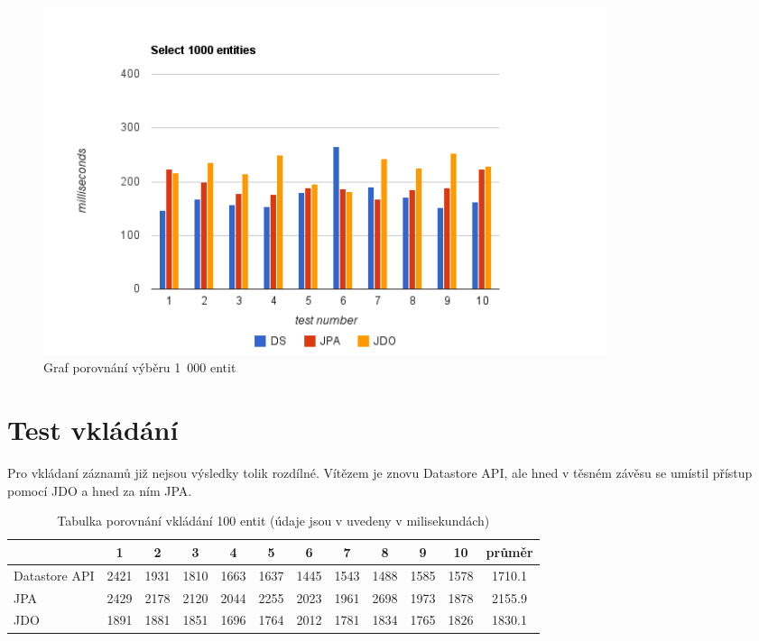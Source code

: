 \begin{figure}[h]
\begin{center}
\includegraphics[width=6.5in]{figures/select.png}
\caption{Graf porovnání výběru 1~000 entit}
\label{fig:select}
\end{center}
\end{figure}

\section{Test vkládání}
Pro vkládaní záznamů již nejsou výsledky tolik rozdílné. Vítězem je znovu Datastore API, ale hned v těsném závěsu se umístil přístup pomocí JDO a hned za ním JPA. 

\begin{table}[h]
\centering
\caption{Tabulka porovnání vkládání 100 entit (údaje jsou v uvedeny v milisekundách)}\label{tab:insert}
\begin{tabular}{|l|c|c|c|c|c|c|c|c|c|c|c|}
   \hline
	& 1		& 2		& 3		& 4		& 5		& 6		& 7		& 8		& 9		& 10		& průměr \\
   \hline
Datastore API	& 2421	& 1931	& 1810	& 1663	& 1637	& 1445	& 1543	& 1488	& 1585	& 1578	& 1710.1 \\
JPA	& 2429	& 2178	& 2120	& 2044	& 2255	& 2023	& 1961	& 2698	& 1973	& 1878	& 2155.9 \\
JDO	& 1891	& 1881	& 1851	& 1696	& 1764	& 2012	& 1781	& 1834	& 1765	& 1826	& 1830.1 \\
   \hline
\end{tabular}
\end{table}

